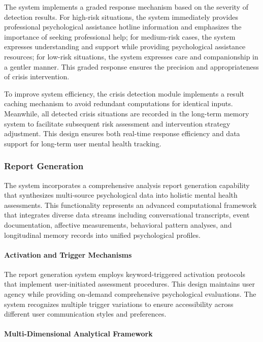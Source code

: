 The system implements a graded response mechanism based on the severity of detection results. For high-risk situations, the system immediately provides professional psychological assistance hotline information and emphasizes the importance of seeking professional help; for medium-risk cases, the system expresses understanding and support while providing psychological assistance resources; for low-risk situations, the system expresses care and companionship in a gentler manner. This graded response ensures the precision and appropriateness of crisis intervention.

To improve system efficiency, the crisis detection module implements a result caching mechanism to avoid redundant computations for identical inputs. Meanwhile, all detected crisis situations are recorded in the long-term memory system to facilitate subsequent risk assessment and intervention strategy adjustment. This design ensures both real-time response efficiency and data support for long-term user mental health tracking.

\subsubsection{Report Generation}

The system incorporates a comprehensive analysis report generation capability that synthesizes multi-source psychological data into holistic mental health assessments. This functionality represents an advanced computational framework that integrates diverse data streams including conversational transcripts, event documentation, affective measurements, behavioral pattern analyses, and longitudinal memory records into unified psychological profiles.

\paragraph{Activation and Trigger Mechanisms}

The report generation system employs keyword-triggered activation protocols that implement user-initiated assessment procedures. This design maintains user agency while providing on-demand comprehensive psychological evaluations. The system recognizes multiple trigger variations to ensure accessibility across different user communication styles and preferences.

\paragraph{Multi-Dimensional Analytical Framework}

